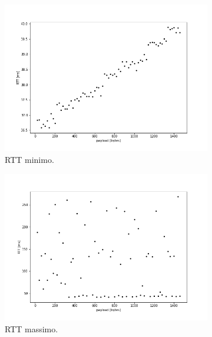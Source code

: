 \documentclass[a4paper,10pt]{article}
\begin{document}
\begin{figure}[h!]
     \centering
     \begin{subfigure}[b]{0.49\textwidth}
         \centering
         \includegraphics[width=\textwidth]{img/min.png}
         \caption{RTT minimo.}
         \label{fig:rttmin}
     \end{subfigure}
     \hfill
     \begin{subfigure}[b]{0.49\textwidth}
         \centering
         \includegraphics[width=\textwidth]{img/max.png}
         \caption{RTT massimo.}
         \label{fig:rttmax}
     \end{subfigure}
     \hfill
     \begin{subfigure}[b]{0.49\textwidth}
         \centering

\end{subfigure}
\end{figure}
\end{document}
